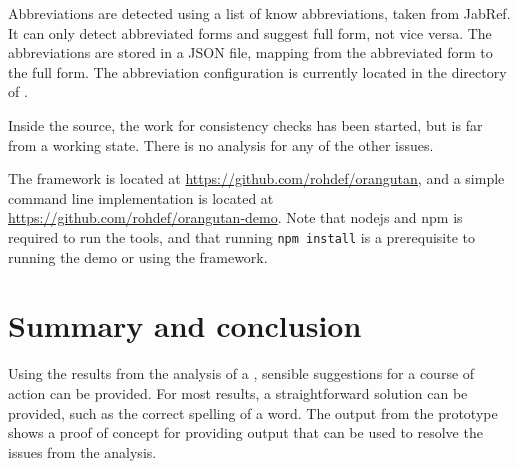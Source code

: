 Abbreviations are detected using a list of know abbreviations, taken
from JabRef.  It can only detect abbreviated forms and suggest full
form, not vice versa.  The abbreviations are stored in a JSON file,
mapping from the abbreviated form to the full form. The abbreviation
configuration is currently located in the directory of {\orangutan}.

Inside the {\orangutan} source, the work for consistency checks has
been started, but is far from a working state.  There is no analysis
for any of the other issues.

The {\orangutan} framework is located at
\url{https://github.com/rohdef/orangutan}, and a simple command line
implementation is located at
\url{https://github.com/rohdef/orangutan-demo}.  Note that nodejs and
npm is required to run the tools, and that running \texttt{npm
  install} is a prerequisite to running the demo or using the
framework.


\section{Summary and conclusion}

Using the results from the analysis of a , sensible
suggestions for a course of action can be provided.  For most results,
a straightforward solution can be provided, such as the correct
spelling of a word.  The output from the prototype {\orangutan} shows
a proof of concept for providing output that can be used to resolve
the issues from the analysis.
